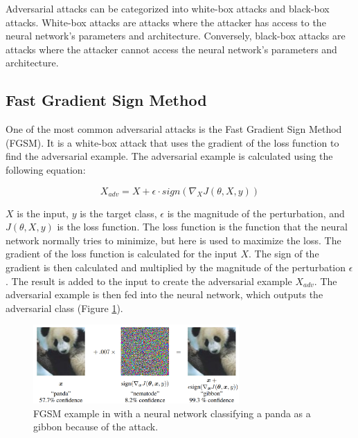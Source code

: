 Adversarial attacks can be categorized into white-box attacks and black-box attacks. White-box attacks are attacks where the attacker has access to the neural network's parameters and architecture. Conversely, black-box attacks are attacks where the attacker cannot access the neural network's parameters and architecture.


\subsection{Fast Gradient Sign Method}

One of the most common adversarial attacks is the Fast Gradient Sign Method (FGSM)\cite{goodfellow2015explaining}. It is a white-box attack that uses the gradient of the loss function to find the adversarial example. The adversarial example is calculated using the following equation:

\begin{equation}
    X_{adv} = X + \epsilon \cdot sign(\nabla_{X}J(\theta, X, y))
\end{equation}

$X$ is the input, $y$ is the target class, $\epsilon$ is the magnitude of the perturbation, and $J(\theta, X, y)$ is the loss function. The loss function is the function that the neural network normally tries to minimize, but here is used to maximize the loss. The gradient of the loss function is calculated for the input $X$. The sign of the gradient is then calculated and multiplied by the magnitude of the perturbation $\epsilon$. The result is added to the input to create the adversarial example $X_{adv}$. The adversarial example is then fed into the neural network, which outputs the adversarial class (Figure \ref*{fig:fgsm}).

\begin{figure}[H]
    \centering
    \includegraphics[width=0.7\textwidth]{../Images/fgsm.png}
    \caption{FGSM example in \cite{goodfellow2015explaining} with a neural network classifying a panda as a gibbon because of the attack.}
    \label{fig:fgsm}
\end{figure}
